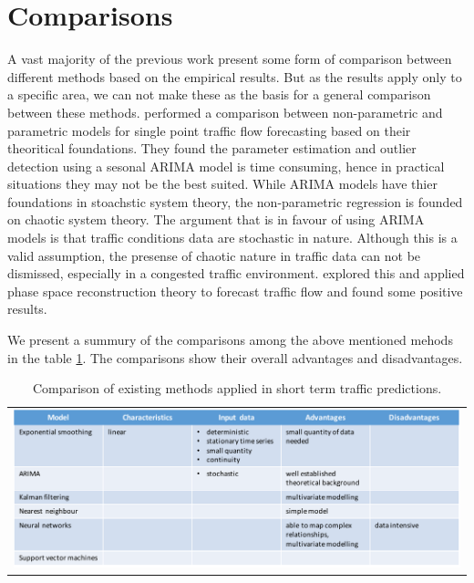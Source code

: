\section{Comparisons}
A vast majority of the previous work present some form of comparison between different methods based
on the empirical results. But as the results apply only to a specific area, we can not make these
as the basis for a general comparison between these methods. \citet{smith2002comparison} performed
a comparison between non-parametric and parametric models for single point traffic flow
forecasting based on their theoritical foundations. They found the parameter estimation and outlier
detection using a sesonal ARIMA model is time consuming, hence in practical situations they may not be the
best suited. While ARIMA models have thier foundations in stoachstic system theory, the non-parametric
regression is founded on chaotic system theory. The argument that is in favour of using ARIMA models
is that traffic conditions data are stochastic in nature. Although this is a valid assumption, the
presense of chaotic nature in traffic data can not be dismissed, especially in a congested traffic
environment. \citet{hu2003applicable} explored this and applied phase space reconstruction theory to
forecast traffic flow and found some positive results.

We present a summury of the comparisons among the above mentioned mehods in the table
\ref{table:comparisonExistingMethods}. The comparisons show their overall advantages and disadvantages.

\begin{table}
    \begin{tabular}{c}
        \includegraphics[width=\textwidth,height=\textheight,keepaspectratio]{Figures/method-comparisons.pdf}
    \end{tabular}
    \caption[Comparison of existing methods]{Comparison of existing methods applied in short term
     traffic predictions.}
    \label{table:comparisonExistingMethods}
\end{table}